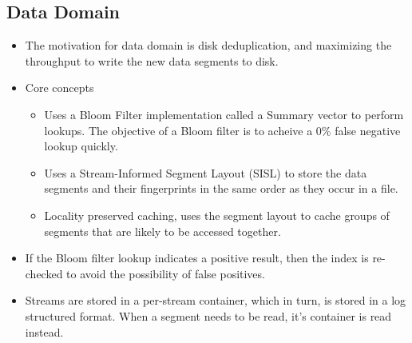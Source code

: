 \documentclass[a4paper]{article}
\begin{document}
\subsection{Data Domain}

\begin{itemize}
\item
    The motivation for data domain is disk deduplication, and maximizing
    the throughput to write the new data segments to disk.
\item
    Core concepts

    \begin{itemize}
        \item
        Uses a Bloom Filter implementation called a Summary vector to
        perform lookups. The objective of a Bloom filter is to acheive a 0\%
        false negative lookup quickly.
    \item
        Uses a Stream-Informed Segment Layout (SISL) to store the data
        segments and their fingerprints in the same order as they occur in a
        file.
    \item
        Locality preserved caching, uses the segment layout to cache groups
        of segments that are likely to be accessed together.
    \end{itemize}
\item
    If the Bloom filter lookup indicates a positive result, then the index
    is re-checked to avoid the possibility of false positives.
\item
    Streams are stored in a per-stream container, which in turn, is stored
    in a log structured format. When a segment needs to be read, it's
    container is read instead.
\end{itemize}
\end{document}
